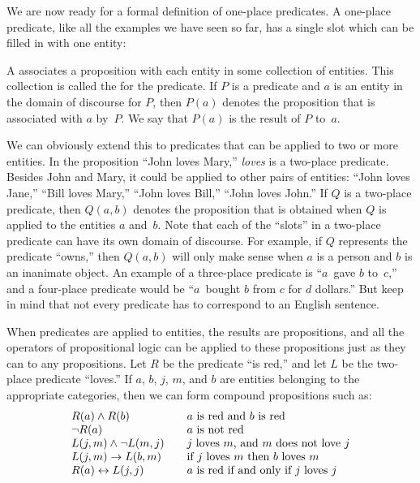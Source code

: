 We are now ready for a formal definition of one-place
predicates.  A one-place
predicate, like all the examples we have seen so far, has a single
slot which can be filled in with one entity:


\begin{definition}
A  associates a proposition with each entity in some
collection of entities.  This collection is called the  for the predicate.  If $P$ is a predicate and $a$ is
an entity in the domain of discourse for $P$, then $P(a)$ denotes
the proposition that is associated with $a$ by~$P$.  We say that $P(a)$
is the result of  $P$ to~$a$.
\end{definition}

We can obviously extend this to predicates that can be applied to
two or more entities.  In the proposition ``John loves Mary,''
\emph{loves} is a two-place predicate.  Besides John and Mary,
it could be applied to other pairs of entities:  ``John loves Jane,''
``Bill loves Mary,'' ``John loves Bill,''  ``John loves John.''
If $Q$ is a two-place
predicate, then $Q(a,b)$ denotes the proposition that is obtained
when $Q$ is applied to the entities $a$ and~$b$.  Note that each of
the ``slots'' in a two-place predicate can have its own domain of
discourse.  For example, if $Q$ represents the predicate ``owns,''
then $Q(a,b)$ will only make sense when $a$ is a person and $b$ is an
inanimate object.  An example of a three-place predicate is
``$a$~gave $b$ to~$c$,'' and a four-place predicate would be
``$a$~bought $b$ from $c$ for $d$ dollars.''  But keep in mind that
not every predicate has to correspond to an English sentence.

When predicates are applied to entities, the results are propositions,
and all the operators of propositional logic can be applied to these
propositions just as they can to any propositions.  Let $R$ be the
predicate ``is red,'' and let $L$ be the two-place predicate ``loves.''
If $a$, $b$, $j$, $m$, and $b$ are entities belonging to the 
appropriate categories, then we can form compound propositions such
as:
\[
\begin{array}{l@{\qquad}l}
   R(a)\AND R(b)         &\text{$a$ is red and $b$ is red}\\
   \NOT R(a)             &\text{$a$ is not red}\\
   L(j,m)\AND\NOT L(m,j) &\text{$j$ loves $m$, and $m$ does not love $j$}\\
   L(j,m)\IMP L(b,m)     &\text{if $j$ loves $m$ then $b$ loves $m$}\\
   R(a)\IFF L(j,j)       &\text{$a$ is red if and only if $j$ loves $j$}\\
\end{array}
\]


